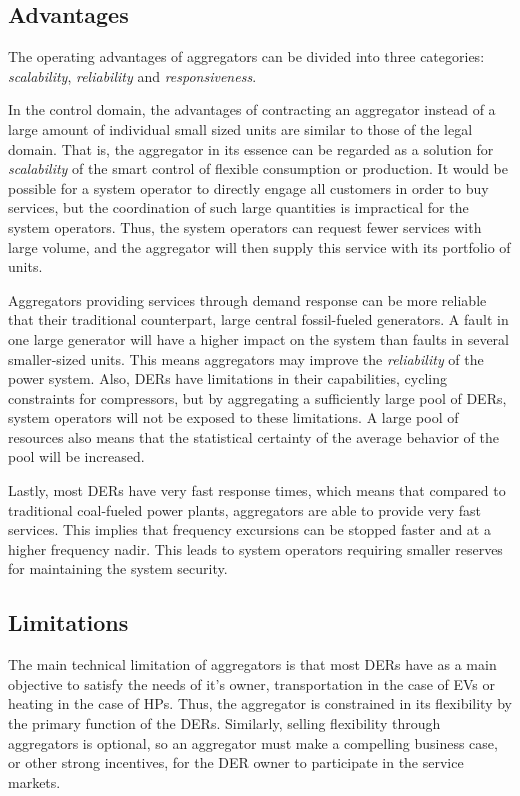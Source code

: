 \subsection*{Advantages}
The operating advantages of aggregators can be divided into three categories: \emph{scalability}, \emph{reliability} and \emph{responsiveness}.

In the control domain, the advantages of contracting an aggregator instead of a large amount of individual small sized units are similar to those of the legal domain. That is, the aggregator in its essence can be regarded as a solution for \emph{scalability} of the smart control of flexible consumption or production. It would be possible for a system operator to directly engage all customers in order to buy services, but the coordination of such large quantities is impractical for the system operators. Thus, the system operators can request fewer services with large volume, and the aggregator will then supply this service with its portfolio of units.

Aggregators providing services through demand response can be more reliable that their traditional counterpart, \ie large central fossil-fueled generators. A fault in one large generator will have a higher impact on the system than faults in several smaller-sized units. This means aggregators may improve the \emph{reliability} of the power system. Also, DERs have limitations in their capabilities, \eg cycling constraints for compressors, but by aggregating a sufficiently large pool of DERs, system operators will not be exposed to these limitations. A large pool of resources also means that the statistical certainty of the average behavior of the pool will be increased.

Lastly, most DERs have very fast response times, which means that compared to traditional coal-fueled power plants, aggregators are able to provide very fast services. This implies that frequency excursions can be stopped faster and at a higher frequency nadir. This leads to system operators requiring smaller reserves for maintaining  the system security.

\subsection*{Limitations}
The main technical limitation of aggregators is that most DERs have as a main objective to satisfy the needs of it's owner, \eg transportation in the case of EVs or heating in the case of HPs. Thus, the aggregator is constrained in its flexibility by the primary function of the DERs. Similarly, selling flexibility through aggregators is optional, so an aggregator must make a compelling business case, or other strong incentives, for the DER owner to participate in the service markets.

